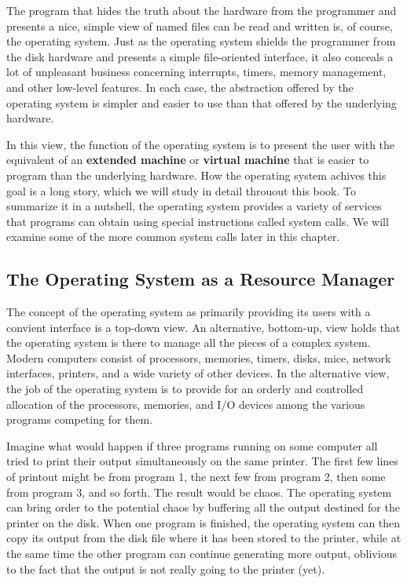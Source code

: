 \documentclass{book}
\newcommand {\kw}  [1] {\textbf{#1}}
\begin{document}
The program that hides the truth about the hardware from the programmer and 
presents a nice, simple view of named files can be read and written is, of course, the operating system.
Just as the operating system shields the programmer from the disk hardware and presents a simple file-oriented interface, 
it also conceals a lot of unpleasant business concerning interrupts, timers, memory management, and other low-level features.
In each case, the abstraction offered by the operating system is simpler and easier to use than that offered by the underlying hardware.

In this view, the function of the operating system is to present the user with the equivalent of an \kw{extended machine} or \kw{virtual machine} 
that is easier to program than the underlying hardware.
How the operating system achives this goal is a long story, which we will study in detail throuout this book.
To summarize it in a nutshell, the operating system provides a variety of services 
that programs can obtain using special instructions called system calls.
We will examine some of the more common system calls later in this chapter.

\subsection{The Operating System as a Resource Manager}
The concept of the operating system as primarily providing its users with a convient interface is a top-down view.
An alternative, bottom-up, view holds that the operating system is there to manage all the pieces of a complex system. 
Modern computers consist of processors, memories, timers, disks, mice, network interfaces, printers, and a wide variety of other devices.
In the alternative view, the job of the operating system is to provide for an orderly and controlled allocation 
of the processors, memories, and I/O devices among the various programs competing for them.

Imagine what would happen if three programs running on some computer all tried to print their output simultaneously on the same printer.
The first few lines of printout might be from program 1, the next few from program 2, then some from program 3, and so forth.
The result would be chaos.
The operating system can bring order to the potential chaos by buffering all the output destined for the printer on the disk.
When one program is finished, the operating system can then copy its output from the disk file where it has been stored to the printer, 
while at the same time the other program can continue generating more output, 
oblivious to the fact that the output is not really going to the printer (yet).
\end{document}
